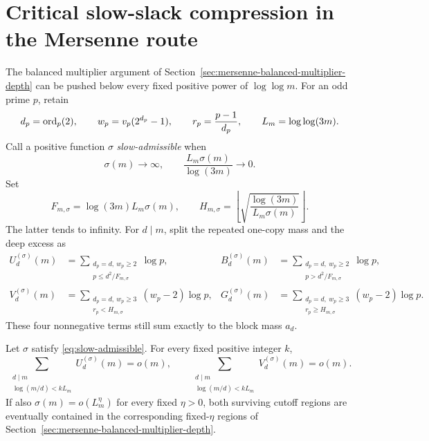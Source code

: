 \section{Critical slow-slack compression in the Mersenne route}
\label{sec:mersenne-critical-slow-slack}

The balanced multiplier argument of
Section~\ref{sec:mersenne-balanced-multiplier-depth} can be pushed below every
fixed positive power of $\log\log m$.  For an odd prime $p$, retain
\[
 d_p=\operatorname{ord}_p(2),\qquad w_p=v_p(2^{d_p}-1),\qquad
 r_p=\frac{p-1}{d_p},\qquad L_m=\log\log(3m).
\]
Call a positive function $\sigma$ \emph{slow-admissible} when
\begin{equation}\label{eq:slow-admissible}
 \sigma(m)\longrightarrow\infty,
 \qquad \frac{L_m\sigma(m)}{\log(3m)}\longrightarrow0.
\end{equation}
Set
\begin{equation}\label{eq:critical-slow-scales}
 F_{m,\sigma}=\log(3m)L_m\sigma(m),
 \qquad
 H_{m,\sigma}=\left\lfloor
 \sqrt{\frac{\log(3m)}{L_m\sigma(m)}}\right\rfloor.
\end{equation}
The latter tends to infinity.  For $d\mid m$, split the repeated one-copy
mass and the deep excess as
\begin{align*}
 U_d^{(\sigma)}(m)
 &=\sum_{\substack{d_p=d,\ w_p\ge2\\p\le d^2/F_{m,\sigma}}}\log p,&
 B_d^{(\sigma)}(m)
 &=\sum_{\substack{d_p=d,\ w_p\ge2\\p>d^2/F_{m,\sigma}}}\log p,\\
 V_d^{(\sigma)}(m)
 &=\sum_{\substack{d_p=d,\ w_p\ge3\\r_p<H_{m,\sigma}}}
       (w_p-2)\log p,&
 G_d^{(\sigma)}(m)
 &=\sum_{\substack{d_p=d,\ w_p\ge3\\r_p\ge H_{m,\sigma}}}
       (w_p-2)\log p.
\end{align*}
These four nonnegative terms still sum exactly to the block mass $a_d$.

\begin{theorem}
\label{thm:mersenne-critical-slow-removal}
Let $\sigma$ satisfy \eqref{eq:slow-admissible}.  For every fixed positive
integer $k$,
\begin{equation}\label{eq:slow-two-negligible-arms}
 \sum_{\substack{d\mid m\\\log(m/d)<kL_m}}U_d^{(\sigma)}(m)=o(m),
 \qquad
 \sum_{\substack{d\mid m\\\log(m/d)<kL_m}}V_d^{(\sigma)}(m)=o(m).
\end{equation}
If also $\sigma(m)=o(L_m^\eta)$ for every fixed $\eta>0$, both surviving
cutoff regions are eventually contained in the corresponding fixed-$\eta$
regions of Section~\ref{sec:mersenne-balanced-multiplier-depth}.
\end{theorem}

